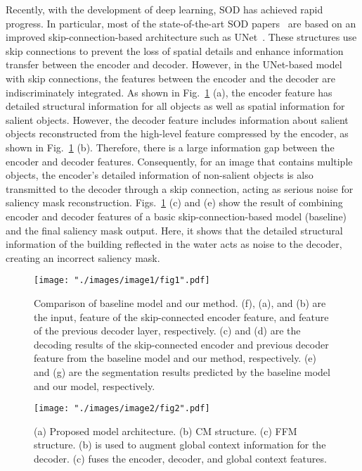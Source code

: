 \documentclass{article}
\begin{document}
Recently, with the development of deep learning, SOD has achieved rapid progress. In particular, most of the state-of-the-art SOD papers~\cite{hou2017deeply, luo2017non, wang2019salient, liu2019employing} are based on an improved skip-connection-based architecture such as UNet~\cite{ronneberger2015u}. These structures use skip connections to prevent the loss of spatial details and enhance information transfer between the encoder and decoder. However, in the UNet-based model with skip connections, the features between the encoder and the decoder are indiscriminately integrated. As shown in Fig.~\ref{fig:1} (a), the encoder feature has detailed structural information for all objects as well as spatial information for salient objects. However, the decoder feature includes information about salient objects reconstructed from the high-level feature compressed by the encoder, as shown in Fig.~\ref{fig:1} (b). Therefore, there is a large information gap between the encoder and decoder features. Consequently, for an image that contains multiple objects, the encoder's detailed information of non-salient objects is also transmitted to the decoder through a skip connection, acting as serious noise for saliency mask reconstruction. Figs.~\ref{fig:1} (c) and (e) show the result of combining encoder and decoder features of a basic skip-connection-based model (baseline) and the final saliency mask output. Here, it shows that the detailed structural information of the building reflected in the water acts as noise to the decoder, creating an incorrect saliency mask.

\begin{figure}[t]
	\setlength{\belowcaptionskip}{-10pt}
	\begin{center}
		\texttt{[image: "./images/image1/fig1".pdf]}
	\end{center}
	\vspace{-0.5cm}
	\caption{Comparison of baseline model and our method. (f), (a), and (b) are the input, feature of the skip-connected encoder feature, and feature of the previous decoder layer, respectively. (c) and (d) are the decoding results of the skip-connected encoder and previous decoder feature from the baseline model and our method, respectively. (e) and (g) are the segmentation results predicted by the baseline model and our model, respectively.}
	\vspace{-0.1cm}
	\label{fig:1}
\end{figure}

\begin{figure*}[t]
	\setlength{\belowcaptionskip}{-10pt}
	\begin{center}
		\texttt{[image: "./images/image2/fig2".pdf]}
	\end{center}
	\vspace{-0.5cm}
	\caption{(a) Proposed model architecture. (b) CM structure. (c) FFM structure. (b) is used to augment global context information for the decoder. (c) fuses the encoder, decoder, and global context features.}
	\label{fig:2}
\end{figure*}
\end{document}
